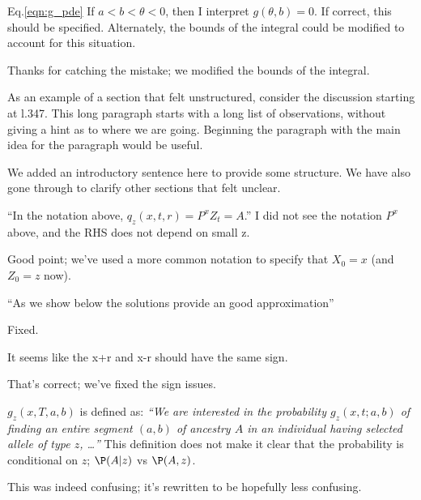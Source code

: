 \begin{point}{Eq.\ref{eqn:g_pde}}
If $a<b<\theta<0$, then I interpret $g(\theta,b) = 0$. If correct, this should be specified.  Alternately, the bounds of the integral could be modified to account for this situation.
\end{point}

\reply
Thanks for catching the mistake; we modified the bounds of the integral.

\begin{point}{}
As an example of a section that felt unstructured, consider the discussion starting at l.347.  This long paragraph starts with a long list of observations, without giving a hint as to where we are going. Beginning the paragraph with the main idea for the paragraph would be useful.
\end{point}

\reply
We added an introductory sentence here to provide some structure. We have also gone through to clarify other sections that felt unclear.

\begin{point}{\revref}
``In the notation above, $q_z(x, t, r) = P^x{Z_t = A}$.''
I did not see the notation $P^x$ above, and the RHS does not depend on small z.
\end{point}

\reply
Good point; we've used a more common notation to specify that $X_0=x$ (and $Z_0=z$ now).

\begin{point}{} 
``As we show below the solutions provide an good approximation''
\end{point}

\reply
Fixed.

\begin{point}{\revref}
It seems like the x+r and x-r should have the same sign.
\end{point}

\reply
That's correct; we've fixed the sign issues.

\begin{point}{\revref}
$g_z(x, T, a,b)$ is defined as: \textit{``We are interested in the probability $g_z(x, t; a, b)$ of finding an entire segment $(a, b)$ of ancestry $A$ in an individual having selected allele of type $z$, \ldots ''}
This definition does not make it clear that the probability is conditional on $z$; $\P(A|z)$ vs $\P(A,z)$.
\end{point}

\reply
This was indeed confusing; it's rewritten to be hopefully less confusing.


